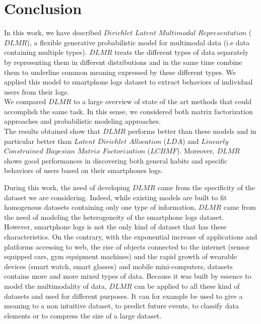 
\chapter{Conclusion} %

\label{Chapter7} %


In this work, we have described $Dirichlet$ $Latent$ $Multimodal$ $Representation$ ($DLMR$), a flexible generative probabilistic model for multimodal data (i.e data containing multiple types). $DLMR$ treats the different types of data separately by representing them in different distributions and in the same time combine them to underline common meaning expressed by these different types. We applied this model to smartphone logs dataset to extract behaviors of individual users from their logs.
\\We compared $DLMR$ to a large overview of state of the art methods that could accomplish the same task. In this sense, we considered both matrix factorization approaches and probabilistic modeling approaches.
\\The results obtained show that $DLMR$ performs better than these models and in particular better than $Latent$ $Dirichlet$ $Allocation$ ($LDA$) and $Linearly$ $Constrained$ $Bayesian$ $Matrix$ $Factorization$ ($LCBMF$). Moreover, $DLMR$ shows good performances in discovering both general habits and specific behaviors of users based on their smartphones logs. \par

During this work, the need of developing $DLMR$ came from the specificity of the dataset we are considering. Indeed, while existing models are built to fit homogenous datasets containing only one type of information, $DLMR$ came from the need of modeling the heterogeneity of the smartphone logs dataset.
\\However, smartphone logs is not the only kind of dataset that has these characteristics. On the contrary, with the exponential increase of applications and platforms accessing to web, the rise of objects connected to the internet (sensor equipped cars, gym equipment machines) and the rapid growth of wearable devices (smart watch, smart glasses) and mobile mini-computers, datasets contains more and more mixed types of data. Because it was built by essence to model the multimodality of data, $DLMR$ can be applied to all these kind of datasets and used for different purposes. It can for example be used to give a meaning to a non intuitive dataset, to predict future events, to classify data elements or to compress the size of a large dataset.

